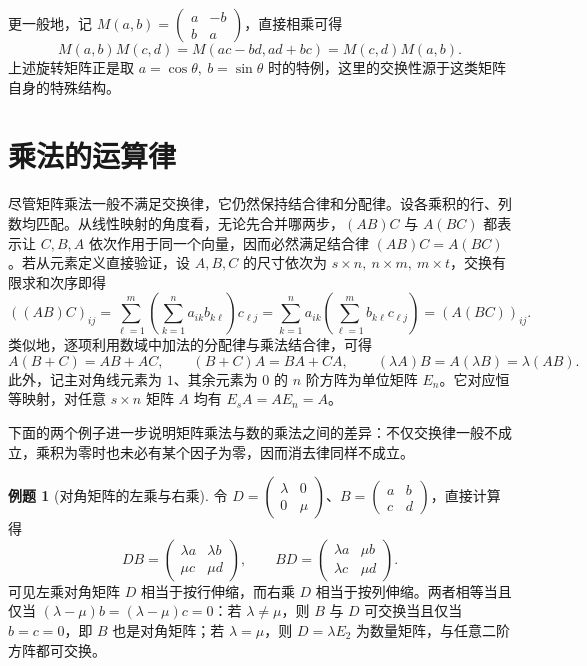\documentclass[UTF8,fontset=fandol,a4paper,12pt]{ctexart}
\theoremstyle{definition}
\newtheorem{example}[definition]{例题}
\begin{document}
更一般地，记 $M(a,b)=\left(\begin{smallmatrix}a&-b\\ b&a\end{smallmatrix}\right)$，直接相乘可得
\[
 M(a,b)M(c,d)=M(ac-bd,ad+bc)=M(c,d)M(a,b).
\]
上述旋转矩阵正是取 $a=\cos\theta,\ b=\sin\theta$ 时的特例，这里的交换性源于这类矩阵自身的特殊结构。

\section{乘法的运算律}

尽管矩阵乘法一般不满足交换律，它仍然保持结合律和分配律。设各乘积的行、列数均匹配。从线性映射的角度看，无论先合并哪两步，$(AB)C$ 与 $A(BC)$ 都表示让 $C,B,A$ 依次作用于同一个向量，因而必然满足结合律 $(AB)C=A(BC)$。若从元素定义直接验证，设 $A,B,C$ 的尺寸依次为 $s\times n,\ n\times m,\ m\times t$，交换有限求和次序即得
\[
 ((AB)C)_{ij}
 =\sum_{\ell=1}^{m}\left(\sum_{k=1}^{n}a_{ik}b_{k\ell}\right)c_{\ell j}
 =\sum_{k=1}^{n}a_{ik}\left(\sum_{\ell=1}^{m}b_{k\ell}c_{\ell j}\right)
 =(A(BC))_{ij}.
\]
类似地，逐项利用数域中加法的分配律与乘法结合律，可得
\[
 A(B+C)=AB+AC,\qquad (B+C)A=BA+CA,\qquad
 (\lambda A)B=A(\lambda B)=\lambda(AB).
\]
此外，记主对角线元素为 $1$、其余元素为 $0$ 的 $n$ 阶方阵为单位矩阵 $E_n$。它对应恒等映射，对任意 $s\times n$ 矩阵 $A$ 均有 $E_sA=AE_n=A$。

下面的两个例子进一步说明矩阵乘法与数的乘法之间的差异：不仅交换律一般不成立，乘积为零时也未必有某个因子为零，因而消去律同样不成立。

\begin{example}[对角矩阵的左乘与右乘]
令 $D=\left(\begin{smallmatrix}\lambda&0\\0&\mu\end{smallmatrix}\right)$、$B=\left(\begin{smallmatrix}a&b\\c&d\end{smallmatrix}\right)$，直接计算得
\[
 DB=\begin{pmatrix}\lambda a&\lambda b\\\mu c&\mu d\end{pmatrix},\qquad
 BD=\begin{pmatrix}\lambda a&\mu b\\\lambda c&\mu d\end{pmatrix}.
\]
可见左乘对角矩阵 $D$ 相当于按行伸缩，而右乘 $D$ 相当于按列伸缩。两者相等当且仅当 $(\lambda-\mu)b=(\lambda-\mu)c=0$：若 $\lambda\ne\mu$，则 $B$ 与 $D$ 可交换当且仅当 $b=c=0$，即 $B$ 也是对角矩阵；若 $\lambda=\mu$，则 $D=\lambda E_2$ 为数量矩阵，与任意二阶方阵都可交换。
\end{example}
\end{document}
